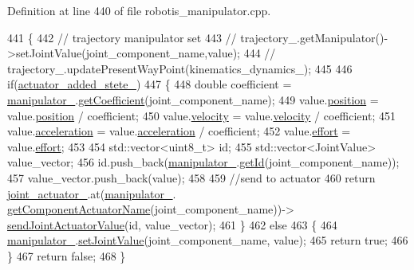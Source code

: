 Definition at line 440 of file robotis\+\_\+manipulator.\+cpp.


\begin{DoxyCode}
441 \{
442   \textcolor{comment}{// trajectory manipulator set}
443   \textcolor{comment}{// trajectory\_.getManipulator()->setJointValue(joint\_component\_name,value);}
444   \textcolor{comment}{// trajectory\_.updatePresentWayPoint(kinematics\_dynamics\_);}
445 
446   \textcolor{keywordflow}{if}(\hyperlink{classrobotis__manipulator_1_1_robotis_manipulator_a02073b7982b992642b28acfa35a17769}{actuator\_added\_stete\_})
447   \{
448     \textcolor{keywordtype}{double} coefficient = \hyperlink{classrobotis__manipulator_1_1_robotis_manipulator_a5b2df4a3b3ee7f408cb1d0eaf61644dc}{manipulator\_}.\hyperlink{classrobotis__manipulator_1_1_manipulator_a437ac5f137aa788c4db07690c185e9ba}{getCoefficient}(joint\_component\_name);
449     value.\hyperlink{structrobotis__manipulator_1_1_point_a0f122386b502d9b316bdead542ed2145}{position} = value.\hyperlink{structrobotis__manipulator_1_1_point_a0f122386b502d9b316bdead542ed2145}{position} / coefficient;
450     value.\hyperlink{structrobotis__manipulator_1_1_point_a4eaec95fac0c755eb0aa704b36ebe97b}{velocity} = value.\hyperlink{structrobotis__manipulator_1_1_point_a4eaec95fac0c755eb0aa704b36ebe97b}{velocity} / coefficient;
451     value.\hyperlink{structrobotis__manipulator_1_1_point_adb49f1fbcc0eaa7f530c54fdf0ede836}{acceleration} = value.\hyperlink{structrobotis__manipulator_1_1_point_adb49f1fbcc0eaa7f530c54fdf0ede836}{acceleration} / coefficient;
452     value.\hyperlink{structrobotis__manipulator_1_1_point_add1a7019fc87cc2ac9bdf033372a9bb6}{effort} = value.\hyperlink{structrobotis__manipulator_1_1_point_add1a7019fc87cc2ac9bdf033372a9bb6}{effort};
453 
454     std::vector<uint8\_t> id;
455     std::vector<JointValue> value\_vector;
456     \textcolor{keywordtype}{id}.push\_back(\hyperlink{classrobotis__manipulator_1_1_robotis_manipulator_a5b2df4a3b3ee7f408cb1d0eaf61644dc}{manipulator\_}.\hyperlink{classrobotis__manipulator_1_1_manipulator_a60db34ef6a62e0b15aa36f9b1571640d}{getId}(joint\_component\_name));
457     value\_vector.push\_back(value);
458 
459     \textcolor{comment}{//send to actuator}
460     \textcolor{keywordflow}{return} \hyperlink{classrobotis__manipulator_1_1_robotis_manipulator_a54dfb941bb2682d321daea25a373ab1c}{joint\_actuator\_}.at(\hyperlink{classrobotis__manipulator_1_1_robotis_manipulator_a5b2df4a3b3ee7f408cb1d0eaf61644dc}{manipulator\_}.
      \hyperlink{classrobotis__manipulator_1_1_manipulator_a371446cbf4d2d5a572b173d713305fb1}{getComponentActuatorName}(joint\_component\_name))->
      \hyperlink{classrobotis__manipulator_1_1_robotis_manipulator_a1e7fb766c94010660f5d9c6ffa0d898b}{sendJointActuatorValue}(\textcolor{keywordtype}{id}, value\_vector);
461   \}
462   \textcolor{keywordflow}{else}
463   \{
464     \hyperlink{classrobotis__manipulator_1_1_robotis_manipulator_a5b2df4a3b3ee7f408cb1d0eaf61644dc}{manipulator\_}.\hyperlink{classrobotis__manipulator_1_1_manipulator_aa740b17551040520851ec8dc1d619bfe}{setJointValue}(joint\_component\_name, value);
465     \textcolor{keywordflow}{return} \textcolor{keyword}{true};
466   \}
467   \textcolor{keywordflow}{return} \textcolor{keyword}{false};
468 \}
\end{DoxyCode}


